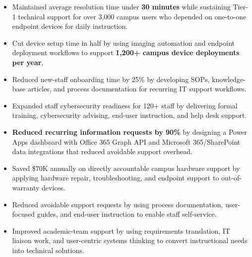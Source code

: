 \par\smallskip
\noindent
\begin{minipage}[t]{20cm}%
  \begin{minipage}[t]{9.75cm}%
    \begin{itemize}
      \item Maintained average resolution time under \textbf{30 minutes} while sustaining Tier-1 technical support for over 3,000 campus users who depended on one-to-one endpoint devices for daily instruction.
      \item Cut device setup time in half by using imaging automation and endpoint deployment workflows to support \textbf{1,200+ campus device deployments per year}.
      \item Reduced new-staff onboarding time by 25\% by developing SOPs, knowledge-base articles, and process documentation for recurring IT support workflows.
      \item Expanded staff cybersecurity readiness for 120+ staff by delivering formal training, cybersecurity advising, end-user instruction, and help desk support.

    \end{itemize}
  \end{minipage}%
  \hfill%
  \begin{minipage}[t]{9.75cm}%
    \begin{itemize}
      \item \textbf{Reduced recurring information requests by 90\%} by designing a Power Apps dashboard with Office 365 Graph API and Microsoft 365/SharePoint data integrations that reduced avoidable support overhead.
      \item Saved \$70K annually on directly accountable campus hardware support by applying hardware repair, troubleshooting, and endpoint support to out-of-warranty devices.
      \item Reduced avoidable support requests by using process documentation, user-focused guides, and end-user instruction to enable staff self-service.
      \item Improved academic-team support by using requirements translation, IT liaison work, and user-centric systems thinking to convert instructional needs into technical solutions.

    \end{itemize}
  \end{minipage}%
\end{minipage}
\divider%

